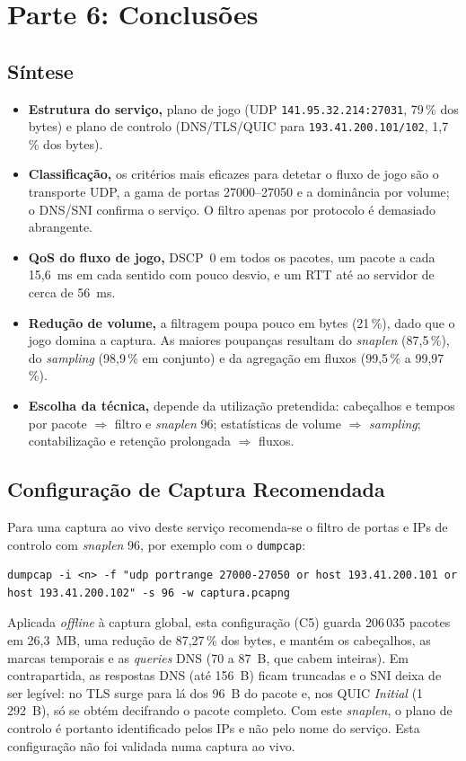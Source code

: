 \documentclass[10.5pt,a4paper]{article}
\newcommand{\ip}[1]{\texttt{#1}}
\begin{document}
\section{Parte 6: Conclusões}

\subsection{Síntese}
\begin{itemize}
  \item \textbf{Estrutura do serviço,} plano de jogo (UDP \ip{141.95.32.214:27031}, 79\,\% dos
        bytes) e plano de controlo (DNS/TLS/QUIC para \ip{193.41.200.101/102}, 1,7\,\% dos bytes).
  \item \textbf{Classificação,} os critérios mais eficazes para detetar o fluxo de jogo são o
        transporte UDP, a gama de portas 27000--27050 e a dominância por volume; o DNS/SNI
        confirma o serviço. O filtro apenas por protocolo é demasiado abrangente.
  \item \textbf{QoS do fluxo de jogo,} DSCP~0 em todos os pacotes, um pacote a cada 15,6~ms em
        cada sentido com pouco desvio, e um RTT até ao servidor de cerca de 56~ms.
  \item \textbf{Redução de volume,} a filtragem poupa pouco em bytes (21\,\%), dado que o jogo
        domina a captura. As maiores poupanças resultam do \emph{snaplen} (87,5\,\%), do
        \emph{sampling} (98,9\,\% em conjunto) e da agregação em fluxos (99,5\,\% a 99,97\,\%).
  \item \textbf{Escolha da técnica,} depende da utilização pretendida: cabeçalhos e tempos por
        pacote $\Rightarrow$ filtro e \emph{snaplen} 96; estatísticas de volume $\Rightarrow$
        \emph{sampling}; contabilização e retenção prolongada $\Rightarrow$ fluxos.
\end{itemize}

\subsection{Configuração de Captura Recomendada}
Para uma captura ao vivo deste serviço recomenda-se o filtro de portas e IPs de controlo com
\emph{snaplen} 96, por exemplo com o \texttt{dumpcap}:
\begin{lstlisting}
dumpcap -i <n> -f "udp portrange 27000-27050 or host 193.41.200.101 or host 193.41.200.102" -s 96 -w captura.pcapng
\end{lstlisting}
Aplicada \emph{offline} à captura global, esta configuração (C5) guarda 206\,035 pacotes em
26,3~MB, uma redução de 87,27\,\% dos bytes, e mantém os cabeçalhos, as marcas temporais e as
\emph{queries} DNS (70 a 87~B, que cabem inteiras). Em contrapartida, as respostas DNS (até
156~B) ficam truncadas e o SNI deixa de ser legível: no TLS surge para lá dos 96~B do pacote e,
nos QUIC \emph{Initial} (1\,292~B), só se obtém decifrando o pacote completo. Com este
\emph{snaplen}, o plano de controlo é portanto identificado pelos IPs e não pelo nome do
serviço. Esta configuração não foi validada numa captura ao vivo.
\end{document}

